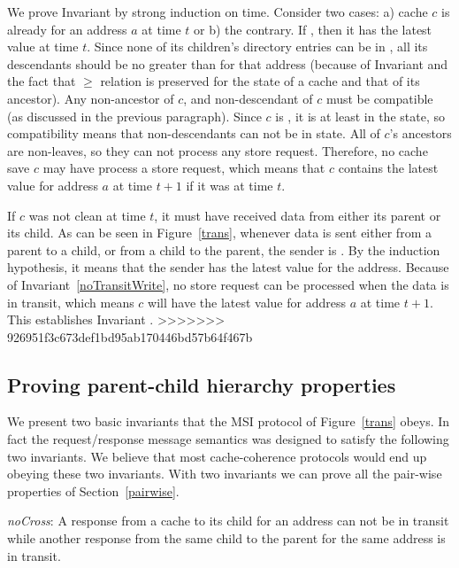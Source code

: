 We prove Invariant  by strong induction on time. Consider
two cases: a) cache $c$ is already \clean{} for an address $a$ at time $t$ or
b) the contrary.  If \clean{}, then it has the latest value at time $t$. Since
none of its children's directory entries can be in \Mo{}, all its descendants
should be no greater than \Sh{} for that address (because of Invariant
 and the fact that $\ge$ relation is preserved for the
state of a cache and that of its ancestor). Any non-ancestor of $c$, and
non-descendant of $c$ must be compatible (as discussed in the previous
paragraph).  Since $c$ is \clean, it is at least in the \Sh{} state, so
compatibility means that non-descendants can not be in \Mo{} state. All of
$c$'s ancestors are non-leaves, so they can not process any store request.
Therefore, no cache save $c$ may have process a store request, which means that
$c$ contains the latest value for address $a$ at time $t+1$ if it was \clean{}
at time $t$.

If $c$ was not clean at time $t$, it must have received data from either its
parent or its child.  As can be seen in Figure~\ref{trans}, whenever data is
sent either from a parent to a child, or from a child to the parent, the sender
is \clean. By the induction hypothesis, it means that the sender has the latest
value for the address. Because of Invariant~\ref{noTransitWrite}, no store
request can be processed when the data is in transit, which means $c$ will have
the latest value for address $a$ at time $t+1$. This establishes Invariant
.
>>>>>>> 926951f3c673def1bd95ab170446bd57b64f467b

\subsection{Proving parent-child hierarchy properties}


We present two basic invariants that the MSI protocol of Figure~\ref{trans}
obeys. In fact the request/response message semantics was designed to satisfy
the following two invariants. We believe that most cache-coherence protocols
would end up obeying these two invariants. With two invariants we can
prove all the pair-wise properties of Section~\ref{pairwise}.

\begin{inv}
\textit{noCross}: A response from a cache to its child for an address can not
be in transit while another response from the same child to the parent for the
same address is in transit.
\label{noCross}
\end{inv}

